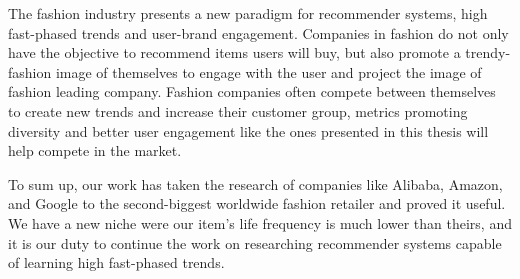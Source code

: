 \documentclass{tex_files/kththesis}
\begin{document}
The fashion industry presents a new paradigm for recommender systems, high fast-phased trends and user-brand engagement. Companies in fashion do not only have the objective to recommend items users will buy, but also promote a trendy-fashion image of themselves to engage with the user and project the image of fashion leading company. Fashion companies often compete between themselves to create new trends and increase their customer group, metrics promoting diversity and better user engagement like the ones presented in this thesis will help compete in the market.

To sum up, our work has taken the research of companies like Alibaba, Amazon, and Google to the second-biggest worldwide fashion retailer and proved it useful. We have a new niche were our item's life frequency is much lower than theirs, and it is our duty to continue the work on researching recommender systems capable of learning high fast-phased trends.

\printbibliography
\end{document}
